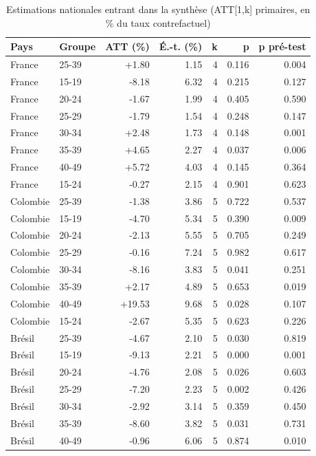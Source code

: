 \begin{table}[htbp]\centering
\begin{threeparttable}
\caption{Estimations nationales entrant dans la synthèse (ATT[1,k] primaires, en \% du taux contrefactuel)}\label{tab:meta_national}
\small
\begin{tabular}{llrrrrr}
\toprule
Pays & Groupe & ATT (\%) & É.-t. (\%) & k & p & p pré-test \\
\midrule
France & 25-39 & +1.80 & 1.15 & 4 & 0.116 & 0.004 \\
France & 15-19 & -8.18 & 6.32 & 4 & 0.215 & 0.127 \\
France & 20-24 & -1.67 & 1.99 & 4 & 0.405 & 0.590 \\
France & 25-29 & -1.79 & 1.54 & 4 & 0.248 & 0.147 \\
France & 30-34 & +2.48 & 1.73 & 4 & 0.148 & 0.001 \\
France & 35-39 & +4.65 & 2.27 & 4 & 0.037 & 0.006 \\
France & 40-49 & +5.72 & 4.03 & 4 & 0.145 & 0.364 \\
France & 15-24 & -0.27 & 2.15 & 4 & 0.901 & 0.623 \\
Colombie & 25-39 & -1.38 & 3.86 & 5 & 0.722 & 0.537 \\
Colombie & 15-19 & -4.70 & 5.34 & 5 & 0.390 & 0.009 \\
Colombie & 20-24 & -2.13 & 5.55 & 5 & 0.705 & 0.249 \\
Colombie & 25-29 & -0.16 & 7.24 & 5 & 0.982 & 0.617 \\
Colombie & 30-34 & -8.16 & 3.83 & 5 & 0.041 & 0.251 \\
Colombie & 35-39 & +2.17 & 4.89 & 5 & 0.653 & 0.019 \\
Colombie & 40-49 & +19.53 & 9.68 & 5 & 0.028 & 0.107 \\
Colombie & 15-24 & -2.67 & 5.35 & 5 & 0.623 & 0.226 \\
Brésil & 25-39 & -4.67 & 2.10 & 5 & 0.030 & 0.819 \\
Brésil & 15-19 & -9.13 & 2.21 & 5 & 0.000 & 0.001 \\
Brésil & 20-24 & -4.76 & 2.08 & 5 & 0.026 & 0.603 \\
Brésil & 25-29 & -7.20 & 2.23 & 5 & 0.002 & 0.426 \\
Brésil & 30-34 & -2.92 & 3.14 & 5 & 0.359 & 0.450 \\
Brésil & 35-39 & -8.60 & 3.82 & 5 & 0.031 & 0.731 \\
Brésil & 40-49 & -0.96 & 6.06 & 5 & 0.874 & 0.010 \\

\end{tabular}
\end{threeparttable}
\end{table}
